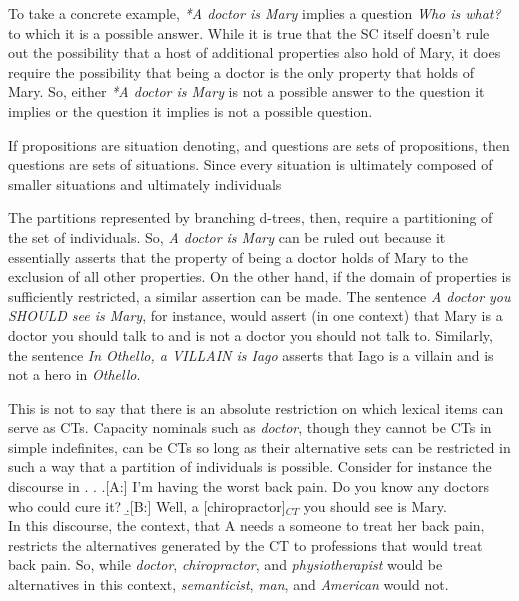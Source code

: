 \documentclass[GPFinal]{subfiles}
\begin{document}
To take a concrete example, \textit{*A doctor is Mary} implies a question \textit{Who is what?} to which it is a possible answer.
While it is true that the SC itself doesn't rule out the possibility that a host of additional properties also hold of Mary, it does require the possibility that being a doctor is the only property that holds of Mary.
So, either \textit{*A doctor is Mary} is not a possible answer to the question it implies or the question it implies is not a possible question.

If propositions are situation denoting, and questions are sets of propositions, then questions are sets of situations.
Since every situation is ultimately composed of smaller situations and ultimately individuals

The partitions represented by branching d-trees, then, require a partitioning of the set of individuals.
So, \textit{A doctor is Mary} can be ruled out because it essentially asserts that the property of being a doctor holds of Mary to the exclusion of all other properties.
On the other hand, if the domain of properties is sufficiently restricted, a similar assertion can be made.
The sentence \textit{A doctor you SHOULD see is Mary}, for instance, would assert (in one context) that Mary is a doctor you should talk to and is not a doctor you should not talk to.
Similarly, the sentence \textit{In Othello, a VILLAIN is Iago} asserts that Iago is a villain and is not a hero in \textit{Othello}.

This is not to say that there is an absolute restriction on which lexical items can serve as CTs.
Capacity nominals such as \textit{doctor}, though they cannot be CTs in simple indefinites, can be CTs so long as their alternative sets can be restricted in such a way that a partition of individuals is possible.
Consider for instance the discourse in \Next.
\ex.
\a.[A:] I'm having the worst back pain. Do you know any doctors who could cure it?
\b.[B:] Well, a [chiropractor]$_{CT}$ you should see is Mary.\\

In this discourse, the context, that A needs a someone to treat her back pain, restricts the alternatives generated by the CT to professions that would treat back pain.
So, while \textit{doctor}, \textit{chiropractor}, and \textit{physiotherapist} would be alternatives in this context, \textit{semanticist}, \textit{man}, and \textit{American} would not.
\end{document}
